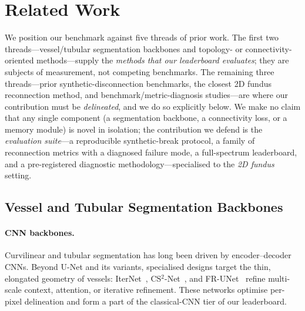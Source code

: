 
\section{Related Work}
\label{sec:related}

We position our benchmark against five threads of prior work. The first two
threads---vessel/tubular segmentation backbones and topology- or
connectivity-oriented methods---supply the \emph{methods that our leaderboard
evaluates}; they are subjects of measurement, not competing benchmarks. The
remaining three threads---prior synthetic-disconnection benchmarks, the closest
2D fundus reconnection method, and benchmark/metric-diagnosis studies---are where
our contribution must be \emph{delineated}, and we do so explicitly below. We
make no claim that any single component (a segmentation backbone, a connectivity
loss, or a memory module) is novel in isolation; the contribution we defend is
the \emph{evaluation suite}---a reproducible synthetic-break protocol, a family
of reconnection metrics with a diagnosed failure mode, a full-spectrum
leaderboard, and a pre-registered diagnostic methodology---specialised to the
\emph{2D fundus} setting.

\subsection{Vessel and Tubular Segmentation Backbones}
\label{sec:related:vessel}

\paragraph{CNN backbones.}
Curvilinear and tubular segmentation has long been driven by encoder--decoder
CNNs. Beyond U-Net and its variants, specialised designs target the thin,
elongated geometry of vessels: IterNet~\cite{key:iternet}, CS$^2$-Net~\cite{key:csnet},
and FR-UNet~\cite{key:frunet} refine multi-scale context, attention, or iterative
refinement. These networks optimise per-pixel delineation and form a part of the
classical-CNN tier of our leaderboard.

